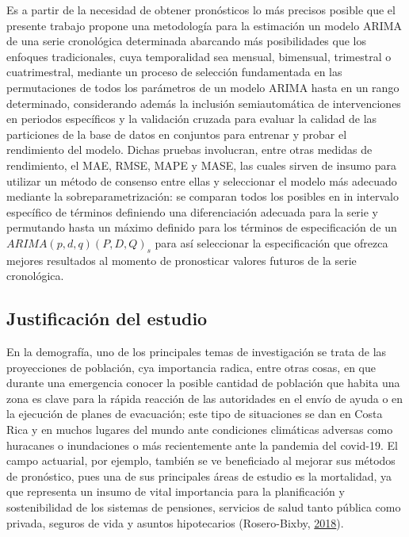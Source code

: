 \documentclass[
]{article}
\begin{document}
Es a partir de la necesidad de obtener pronósticos lo más precisos
posible que el presente trabajo propone una metodología para la
estimación un modelo ARIMA de una serie cronológica determinada
abarcando más posibilidades que los enfoques tradicionales, cuya
temporalidad sea mensual, bimensual, trimestral o cuatrimestral,
mediante un proceso de selección fundamentada en las permutaciones de
todos los parámetros de un modelo ARIMA hasta en un rango determinado,
considerando además la inclusión semiautomática de intervenciones en
periodos específicos y la validación cruzada para evaluar la calidad de
las particiones de la base de datos en conjuntos para entrenar y probar
el rendimiento del modelo. Dichas pruebas involucran, entre otras
medidas de rendimiento, el MAE, RMSE, MAPE y MASE, las cuales sirven de
insumo para utilizar un método de consenso entre ellas y seleccionar el
modelo más adecuado mediante la sobreparametrización: se comparan todos
los posibles en in intervalo específico de términos definiendo una
diferenciación adecuada para la serie y permutando hasta un máximo
definido para los términos de especificación de un
\(ARIMA(p, d, q)(P, D, Q)_s\) para así seleccionar la especificación que
ofrezca mejores resultados al momento de pronosticar valores futuros de
la serie cronológica.

\subsection{Justificación del estudio}

En la demografía, uno de los principales temas de investigación se trata
de las proyecciones de población, cya importancia radica, entre otras
cosas, en que durante una emergencia conocer la posible cantidad de
población que habita una zona es clave para la rápida reacción de las
autoridades en el envío de ayuda o en la ejecución de planes de
evacuación; este tipo de situaciones se dan en Costa Rica y en muchos
lugares del mundo ante condiciones climáticas adversas como huracanes o
inundaciones o más recientemente ante la pandemia del covid-19. El campo
actuarial, por ejemplo, también se ve beneficiado al mejorar sus métodos
de pronóstico, pues una de sus principales áreas de estudio es la
mortalidad, ya que representa un insumo de vital importancia para la
planificación y sostenibilidad de los sistemas de pensiones, servicios
de salud tanto pública como privada, seguros de vida y asuntos
hipotecarios (Rosero-Bixby, \protect\hyperlink{ref-supenprodc}{2018}).
\end{document}
